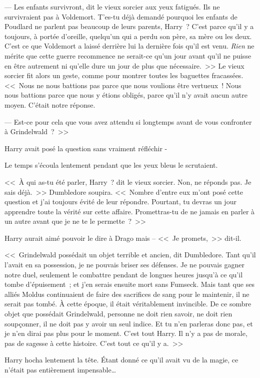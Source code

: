 --- Les enfants survivront, dit le vieux sorcier aux yeux fatigués. Ils ne survivraient pas à Voldemort. T'es-tu déjà demandé pourquoi les enfants de Poudlard ne parlent pas beaucoup de leurs parents, Harry~? C'est parce qu'il y a toujours, à portée d'oreille, quelqu'un qui a perdu son père, sa mère ou les deux. C'est ce que Voldemort a laissé derrière lui la dernière fois qu'il est venu. \emph{Rien} ne mérite que cette guerre recommence ne serait-ce qu'un jour avant qu'il ne puisse en être autrement ni qu'elle dure un jour de plus que nécessaire.~>> Le vieux sorcier fit alors un geste, comme pour montrer toutes les baguettes fracassées. <<~Nous ne nous battions pas parce que nous voulions être vertueux~! Nous nous battions parce que nous y étions obligés, parce qu'il n'y avait aucun autre moyen. C'était notre réponse.

--- Est-ce pour cela que vous avez attendu si longtemps avant de vous confronter à Grindelwald~?~>>

Harry avait posé la question sans vraiment réfléchir -

Le temps s'écoula lentement pendant que les yeux bleus le scrutaient.

<<~À qui as-tu été parler, Harry~? dit le vieux sorcier. Non, ne réponds pas. Je sais déjà.~>> Dumbledore soupira. <<~Nombre d'entre eux m'ont posé cette question et j'ai toujours évité de leur répondre. Pourtant, tu devras un jour apprendre toute la vérité sur cette affaire. Promettras-tu de ne jamais en parler à un autre avant que je ne te le permette~?~>>

Harry aurait aimé pouvoir le dire à Drago mais -- <<~Je promets,~>> dit-il.

<<~Grindelwald possédait un objet terrible et ancien, dit Dumbledore. Tant qu'il l'avait en sa possession, je ne pouvais briser ses défenses. Je ne pouvais gagner notre duel, seulement le combattre pendant de longues heures jusqu'à ce qu'il tombe d'épuisement~; et j'en serais ensuite mort sans Fumseck. Mais tant que ses alliés Moldus continuaient de faire des sacrifices de sang pour le maintenir, il ne serait pas tombé. À cette époque, il était véritablement invincible. De ce sombre objet que possédait Grindelwald, personne ne doit rien savoir, ne doit rien soupçonner, il ne doit pas y avoir un seul indice. Et tu n'en parleras donc pas, et je n'en dirai pas plus pour le moment. C'est tout Harry. Il n'y a pas de morale, pas de sagesse à cette histoire. C'est tout ce qu'il y a.~>>

Harry hocha lentement la tête. Étant donné ce qu'il avait vu de la magie, ce n'était pas entièrement impensable…

